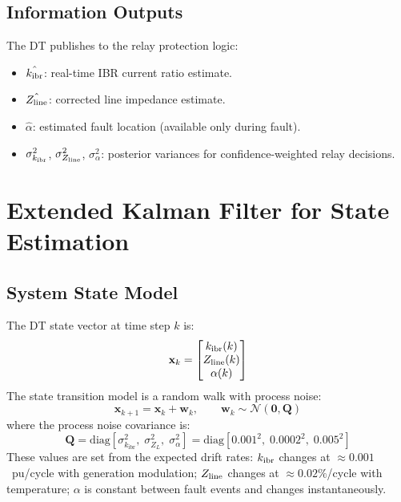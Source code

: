\subsection{Information Outputs}

The DT publishes to the relay protection logic:
\begin{itemize}
\item $\hat{k_\mathrm{ibr}}$: real-time IBR current ratio estimate.
\item $\hat{Z_\mathrm{line}}$: corrected line impedance estimate.
\item $\hat{\alpha}$: estimated fault location (available only during fault).
\item $\sigma_{k_\mathrm{ibr}}^2$, $\sigma_{Z_\mathrm{line}}^2$, $\sigma_\alpha^2$: posterior
      variances for confidence-weighted relay decisions.
\end{itemize}

\section{Extended Kalman Filter for State Estimation}
\label{sec:ch9_ekf}

\subsection{System State Model}

The DT state vector at time step $k$ is:
\begin{equation}
  \mathbf{x}_k = \begin{bmatrix}k_\mathrm{ibr}(k) \\ Z_\mathrm{line}(k) \\ \alpha(k)\end{bmatrix}
  \label{eq:ch7_state}
\end{equation}
The state transition model is a random walk with process noise:
\begin{equation}
  \mathbf{x}_{k+1} = \mathbf{x}_k + \mathbf{w}_k, \qquad
  \mathbf{w}_k \sim \mathcal{N}(\mathbf{0}, \mathbf{Q})
  \label{eq:ch7_state_transition}
\end{equation}
where the process noise covariance is:
\begin{equation}
  \mathbf{Q} = \mathrm{diag}\!\left[\sigma_{k_\mathrm{ibr}}^2,\;
    \sigma_{Z_L}^2,\; \sigma_\alpha^2\right]
  = \mathrm{diag}[0.001^2,\; 0.0002^2,\; 0.005^2]
  \label{eq:ch7_Q}
\end{equation}
These values are set from the expected drift rates:
$k_\mathrm{ibr}$ changes at $\approx 0.001$~pu/cycle with generation modulation;
$Z_\mathrm{line}$ changes at $\approx 0.02\%$/cycle with temperature;
$\alpha$ is constant between fault events and changes instantaneously.

